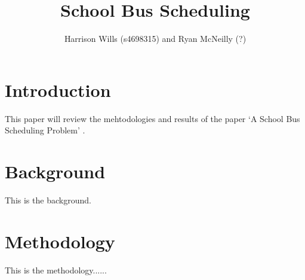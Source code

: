 \documentclass{article}
\title{School Bus Scheduling}
\author{Harrison Wills (s4698315) and Ryan McNeilly (?)}
\begin{document}
\maketitle

\section{Introduction}
This paper will review the mehtodologies and results of the paper 
`A School Bus Scheduling Problem' \parencite{KIM2012577}.

\section{Background}
This is the background.

\section{Methodology}
This is the methodology......

\printbibliography
\end{document}
